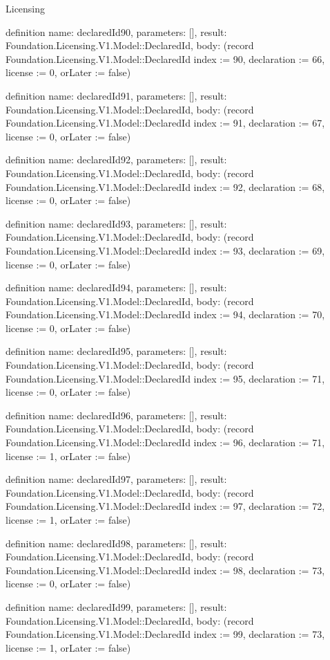 \begin{lexlean}{Licensing}
\begin{semanticmodule}
definition{
  name: declaredId90,
  parameters: [],
  result: Foundation.Licensing.V1.Model::DeclaredId,
  body: (record Foundation.Licensing.V1.Model::DeclaredId {index := 90, declaration := 66, license := 0, orLater := false})
}

definition{
  name: declaredId91,
  parameters: [],
  result: Foundation.Licensing.V1.Model::DeclaredId,
  body: (record Foundation.Licensing.V1.Model::DeclaredId {index := 91, declaration := 67, license := 0, orLater := false})
}

definition{
  name: declaredId92,
  parameters: [],
  result: Foundation.Licensing.V1.Model::DeclaredId,
  body: (record Foundation.Licensing.V1.Model::DeclaredId {index := 92, declaration := 68, license := 0, orLater := false})
}

definition{
  name: declaredId93,
  parameters: [],
  result: Foundation.Licensing.V1.Model::DeclaredId,
  body: (record Foundation.Licensing.V1.Model::DeclaredId {index := 93, declaration := 69, license := 0, orLater := false})
}

definition{
  name: declaredId94,
  parameters: [],
  result: Foundation.Licensing.V1.Model::DeclaredId,
  body: (record Foundation.Licensing.V1.Model::DeclaredId {index := 94, declaration := 70, license := 0, orLater := false})
}

definition{
  name: declaredId95,
  parameters: [],
  result: Foundation.Licensing.V1.Model::DeclaredId,
  body: (record Foundation.Licensing.V1.Model::DeclaredId {index := 95, declaration := 71, license := 0, orLater := false})
}

definition{
  name: declaredId96,
  parameters: [],
  result: Foundation.Licensing.V1.Model::DeclaredId,
  body: (record Foundation.Licensing.V1.Model::DeclaredId {index := 96, declaration := 71, license := 1, orLater := false})
}

definition{
  name: declaredId97,
  parameters: [],
  result: Foundation.Licensing.V1.Model::DeclaredId,
  body: (record Foundation.Licensing.V1.Model::DeclaredId {index := 97, declaration := 72, license := 1, orLater := false})
}

definition{
  name: declaredId98,
  parameters: [],
  result: Foundation.Licensing.V1.Model::DeclaredId,
  body: (record Foundation.Licensing.V1.Model::DeclaredId {index := 98, declaration := 73, license := 0, orLater := false})
}

definition{
  name: declaredId99,
  parameters: [],
  result: Foundation.Licensing.V1.Model::DeclaredId,
  body: (record Foundation.Licensing.V1.Model::DeclaredId {index := 99, declaration := 73, license := 1, orLater := false})
}


\end{semanticmodule}
\end{lexlean}
